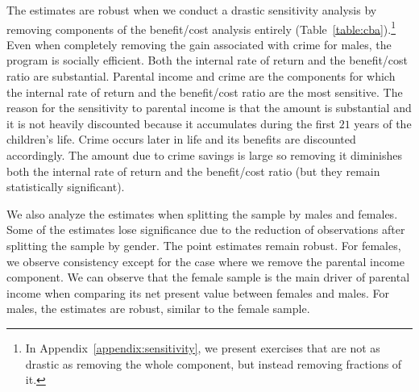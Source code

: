 The estimates are robust when we conduct a drastic sensitivity analysis by removing components of the benefit/cost analysis entirely (Table~\ref{table:cba}).\footnote{In Appendix~\ref{appendix:sensitivity}, we present exercises that are not as drastic as removing the whole component, but instead removing fractions of it.} Even when completely removing the gain associated with crime for males, the program is socially efficient. Both the internal rate of return and the benefit/cost ratio are substantial. Parental income and crime are the components for which the internal rate of return and the benefit/cost ratio are the most sensitive. The reason for the sensitivity to parental income is that the amount is substantial and it is not heavily discounted because it accumulates during the first $21$ years of the children's life. Crime occurs later in life and its benefits are discounted accordingly. The amount due to crime savings is large so removing it diminishes both the internal rate of return and the benefit/cost ratio (but they remain statistically significant).

We also analyze the estimates when splitting the sample by males and females. Some of the estimates lose significance due to the reduction of observations after splitting the sample by gender. The point estimates remain robust. For females, we observe consistency except for the case where we remove the parental income component. We can observe that the female sample is the main driver of parental income when comparing its net present value between females and males. For males, the estimates are robust, similar to the female sample. 

